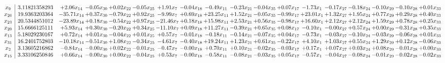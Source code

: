 \documentclass[9pt]{article}
\begin{document}
 \[\begin{array}{c| c c@{\hskip 2pt} c@{\hskip 2pt} c@{\hskip 2pt} c@{\hskip 2pt} c@{\hskip 2pt} c@{\hskip 2pt} c@{\hskip 2pt} c@{\hskip 2pt} c@{\hskip 2pt} c@{\hskip 2pt} c@{\hskip 2pt} c@{\hskip 2pt} c@{\hskip 2pt} c@{\hskip 2pt} c@{\hskip 2pt} c@{\hskip 2pt} }
 x_{9}   &  3.11821358293 & +  2.06 x_{14} & -0.05 x_{30} & +  0.02 x_{22} & -0.05 x_{25} & +  1.91 x_{7} & -0.04 x_{18} & -0.49 x_{11} & -0.23 x_{21} & -0.04 x_{35} & +  0.07 x_{17} & -1.73 x_{1} & -0.17 x_{27} & -0.18 x_{24} & -0.10 x_{29} & -0.10 x_{28} & +  0.01 x_{33}\\
 x_{26}   &  19.9363203364 & -35.71 x_{14} & +  0.37 x_{30} & -0.79 x_{22} & +  0.92 x_{25} & -9.99 x_{7} & +  0.69 x_{18} & + 23.25 x_{11} & +  1.52 x_{21} & -0.05 x_{35} & -0.99 x_{17} & + 23.01 x_{1} & +  1.32 x_{27} & +  1.95 x_{24} & +  0.77 x_{29} & +  0.29 x_{28} & +  0.40 x_{33}\\
 x_{23}   &  20.5344851012 & -23.89 x_{14} & +  0.18 x_{30} & -0.54 x_{22} & +  0.97 x_{25} & -21.46 x_{7} & +  0.18 x_{18} & + 15.98 x_{11} & +  2.53 x_{21} & +  0.56 x_{35} & -0.98 x_{17} & + 16.60 x_{1} & +  2.12 x_{27} & +  2.12 x_{24} & +  1.59 x_{29} & +  0.78 x_{28} & +  0.25 x_{33}\\
 x_{20}   &  15.6666125111 & +  5.93 x_{14} & +  0.30 x_{30} & -0.20 x_{22} & +  0.34 x_{25} & -11.10 x_{7} & +  0.09 x_{18} & + 11.27 x_{11} & -0.39 x_{21} & +  0.65 x_{35} & +  0.08 x_{17} & -0.10 x_{1} & -0.00 x_{27} & +  0.57 x_{24} & +  0.00 x_{29} & -0.31 x_{28} & +  0.35 x_{33}\\
 x_{13}   &  5.18029230167 & +  0.72 x_{14} & +  0.01 x_{30} & -0.04 x_{22} & +  0.01 x_{25} & +  0.57 x_{7} & -0.01 x_{18} & -0.18 x_{11} & -0.14 x_{21} & -0.07 x_{35} & +  0.04 x_{17} & -0.73 x_{1} & -0.03 x_{27} & -0.10 x_{24} & -0.03 x_{29} & -0.06 x_{28} & +  0.01 x_{33}\\
 x_{31}   &  16.2401752803 & -10.18 x_{14} & -0.51 x_{30} & +  1.08 x_{22} & -0.34 x_{25} & -4.61 x_{7} & -0.40 x_{18} & + 19.24 x_{11} & +  1.23 x_{21} & +  0.61 x_{35} & -0.22 x_{17} & +  4.10 x_{1} & +  1.03 x_{27} & +  0.55 x_{24} & +  1.29 x_{29} & +  0.12 x_{28} & -0.06 x_{33}\\
 x_{2}   &  3.13605216862 & -0.84 x_{14} & -0.00 x_{30} & +  0.02 x_{22} & -0.01 x_{25} & -0.47 x_{7} & -0.00 x_{18} & +  0.70 x_{11} & +  0.10 x_{21} & -0.02 x_{35} & -0.03 x_{17} & +  0.17 x_{1} & +  0.07 x_{27} & +  0.03 x_{24} & +  0.08 x_{29} & -0.01 x_{28} & +  0.00 x_{33}\\
 x_{15}   &  3.33106250846 & +  0.66 x_{14} & -0.00 x_{30} & +  0.00 x_{22} & -0.04 x_{25} & +  0.53 x_{7} & -0.00 x_{18} & -0.58 x_{11} & -0.08 x_{21} & -0.03 x_{35} & +  0.05 x_{17} & -0.57 x_{1} & -0.04 x_{27} & -0.08 x_{24} & -0.01 x_{29} & -0.02 x_{28} & -0.02 x_{33}\\

\end{array}\]
\end{document}

